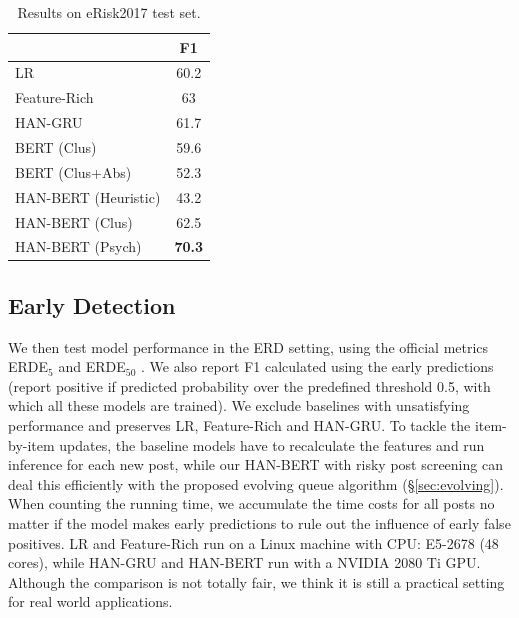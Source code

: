 \begin{table}[t]
    \centering
    \small
    \begin{tabular}{l|c}
        \hline
        {} & F1 \\
        \hline
        LR & 60.2 \\
        Feature-Rich & 63 \\
        \hline
        HAN-GRU & 61.7 \\
        BERT (Clus) & 59.6 \\
        BERT (Clus+Abs) & 52.3 \\
        HAN-BERT (Heuristic) & 43.2 \\
        HAN-BERT (Clus) & 62.5 \\
        \hline
        HAN-BERT (Psych) & \textbf{70.3} \\
        \hline
    \end{tabular}
    \caption{\label{table:erisk2017} Results on eRisk2017 test set.}
\end{table}

\subsection{Early Detection}

We then test model performance in the ERD setting, using the official metrics ERDE$_{5}$ and ERDE$_{50}$ \cite{losada2017erisk}. We also report F1 calculated using the early predictions (report positive if predicted probability over the predefined threshold 0.5, with which all these models are trained). We exclude baselines with unsatisfying performance and preserves LR, Feature-Rich and HAN-GRU. To tackle the item-by-item updates, the baseline models have to recalculate the features and run inference for each new post, while our HAN-BERT with risky post screening can deal this efficiently with the proposed evolving queue algorithm (\S \ref{sec:evolving}). When counting the running time, we accumulate the time costs for all posts no matter if the model makes early predictions to rule out the influence of early false positives. LR and Feature-Rich run on a Linux machine with CPU: E5-2678 (48 cores), while HAN-GRU and HAN-BERT run with a NVIDIA 2080 Ti GPU. Although the comparison is not totally fair, we think it is still a practical setting for real world applications.

